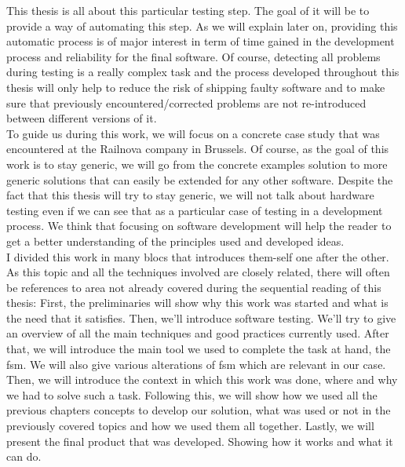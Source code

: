 \documentclass[12pt]{article}
\theoremstyle{definition}
\theoremstyle{definition}
\theoremstyle{remark}
\begin{document}
This thesis is all about this particular testing step. The goal of it will be to provide a way of automating this step. As we will explain later on, providing this automatic process is of major interest in term of time gained in the development process and reliability for the final software. Of course, detecting all problems during testing is a really complex task and the process developed throughout this thesis will only help to reduce the risk of shipping faulty software and to make sure that previously encountered/corrected problems are not re-introduced between different versions of it.\\

To guide us during this work, we will focus on a concrete case study that was encountered at the Railnova company in Brussels. Of course, as the goal of this work is to stay generic, we will go from the concrete examples solution to more generic solutions that can easily be extended for any other software. Despite the fact that this thesis will try to stay generic, we will not talk about hardware testing even if we can see that as a particular case of testing in a development process. We think that focusing on software development will help the reader to get a better understanding of the principles used and developed ideas.\\

I divided this work in many blocs that introduces them-self one after the other. As this topic and all the techniques involved are closely related, there will often be references to area not already covered during the sequential reading of this thesis:
First, the preliminaries will show why this work was started and what is the need that it satisfies. Then, we'll introduce software testing. We'll try to give an overview of all the main techniques and good practices currently used. After that, we will introduce the main tool we used to complete the task at hand, the \gls{fsm}. We will also give various alterations of \gls{fsm} which are relevant in our case. Then, we will introduce the context in which this work was done, where and why we had to solve such a task. Following this, we will show how we used all the previous chapters concepts to develop our solution, what was used or not in the previously covered topics and how we used them all together. Lastly, we will present the final product that was developed. Showing how it works and what it can do.


\end{document}
